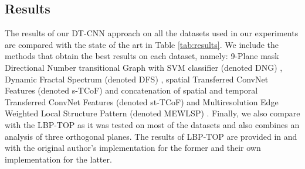 \documentclass[a4paper,11pt]{article}
\begin{document}
\subsection{Results}%
\label{subsec:Results}
The results of our DT-CNN approach on all the datasets used in our experiments are compared with the state of the art in Table \ref{tab:results}. We include the methods that obtain the best results on each dataset, namely:
9-Plane mask Directional Number transitional Graph with SVM classifier (denoted DNG) \cite{ramirez2015spatiotemporal}, Dynamic Fractal Spectrum (denoted DFS) \cite{xu2011dynamic},
spatial Transferred ConvNet Features (denoted s-TCoF) and concatenation of spatial and temporal Transferred ConvNet Features (denoted st-TCoF) \cite{qi2016dynamic}
and Multiresolution Edge Weighted Local Structure Pattern (denoted MEWLSP) \cite{tiwari2016dynamic}.
Finally, we also compare with the LBP-TOP \cite{zhao2007dynamic} as it was tested on most of the datasets and also combines an analysis of three orthogonal planes.
The results of LBP-TOP are provided in \cite{norouznezhad2012directional} and \cite{qi2016dynamic} with the original author's implementation \cite{zhao2007dynamic} for the former and their own implementation for the latter.
\begin{table*}[!t]
\caption{Accuracy results (\%) on DT datasets of the proposed DT-CNN approaches and of the state of the art.} \label{tab:results}
\centering
{}
\end{table*}
\end{document}
